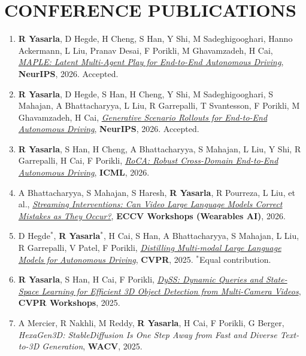 \documentclass[margin,11pt]{resume}
\begin{document}
\vspace{-0.8em}
\section{\footnotesize {\large C}ONFERENCE {\large P}UBLICATIONS}
\begin{enumerate}[leftmargin=*,itemsep=0pt,topsep=2pt]
    \item \textbf{R Yasarla}, D Hegde, H Cheng, S Han, Y Shi, M Sadeghigooghari, Hanno Ackermann, L Liu, Pranav Desai, F Porikli, M Ghavamzadeh, H Cai, \textit{\href{https://arxiv.org/pdf/2605.14201v3}{MAPLE: Latent Multi-Agent Play for End-to-End Autonomous Driving}}, \textbf{NeurIPS}, 2026. Accepted.
    \item \textbf{R Yasarla}, D Hegde, S Han, H Cheng, Y Shi, M Sadeghigooghari, S Mahajan, A Bhattacharyya, L Liu, R Garrepalli, T Svantesson, F Porikli, M Ghavamzadeh, H Cai, \textit{\href{https://arxiv.org/pdf/2601.11475v2}{Generative Scenario Rollouts for End-to-End Autonomous Driving}}, \textbf{NeurIPS}, 2026. Accepted.
    \item \textbf{R Yasarla}, S Han, H Cheng, A Bhattacharyya, S Mahajan, L Liu, Y Shi, R Garrepalli, H Cai, F Porikli, \textit{\href{https://arxiv.org/pdf/2506.10145v3}{RoCA: Robust Cross-Domain End-to-End Autonomous Driving}}, \textbf{ICML}, 2026.
    \item A Bhattacharyya, S Mahajan, S Haresh, \textbf{R Yasarla}, R Pourreza, L Liu, et al., \textit{\href{https://arxiv.org/abs/2606.09547}{Streaming Interventions: Can Video Large Language Models Correct Mistakes as They Occur?}}, \textbf{ECCV Workshops (Wearables AI)}, 2026.
    \item D Hegde$^{*}$, \textbf{R Yasarla$^{*}$}, H Cai, S Han, A Bhattacharyya, S Mahajan, L Liu, R Garrepalli, V Patel, F Porikli, \textit{\href{https://openaccess.thecvf.com/content/CVPR2025/papers/Hegde_Distilling_Multi-modal_Large_Language_Models_for_Autonomous_Driving_CVPR_2025_paper.pdf}{Distilling Multi-modal Large Language Models for Autonomous Driving}}, \textbf{CVPR}, 2025. $^{*}$Equal contribution.
    \item \textbf{R Yasarla}, S Han, H Cai, F Porikli, \textit{\href{https://openaccess.thecvf.com/content/CVPR2025W/WAD/papers/Yasarla_DySS_Dynamic_Queries_and_State-Space_Learning_for_Efficient_3D_Object_CVPRW_2025_paper.pdf}{DySS: Dynamic Queries and State-Space Learning for Efficient 3D Object Detection from Multi-Camera Videos}}, \textbf{CVPR Workshops}, 2025.
    \item A Mercier, R Nakhli, M Reddy, \textbf{R Yasarla}, H Cai, F Porikli, G Berger, \textit{HexaGen3D: StableDiffusion Is One Step Away from Fast and Diverse Text-to-3D Generation}, \textbf{WACV}, 2025.

\end{enumerate}
\end{document}
